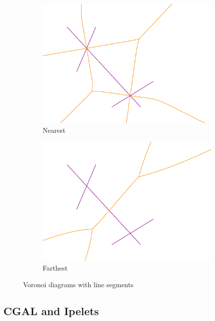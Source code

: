 \documentclass[11pt,a4paper,english]{article}
\begin{document}
	\begin{figure}[h]
    \centering
    \begin{subfigure}[b]{0.45\textwidth}
        \includegraphics[width=\textwidth]{SVD_example}
        \caption{Nearest}
        \label{fig:SVD_example}
    \end{subfigure}
	\qquad
    \begin{subfigure}[b]{0.45\textwidth}
        \includegraphics[width=\textwidth]{FSVD_example}
        \caption{Farthest}
        \label{fig:FSVD_example}
    \end{subfigure}
    \caption{Voronoi diagrams with line segments\label{fig:examples}}
	\end{figure}
	
	\subsection{CGAL and Ipelets}
	
\end{document}
